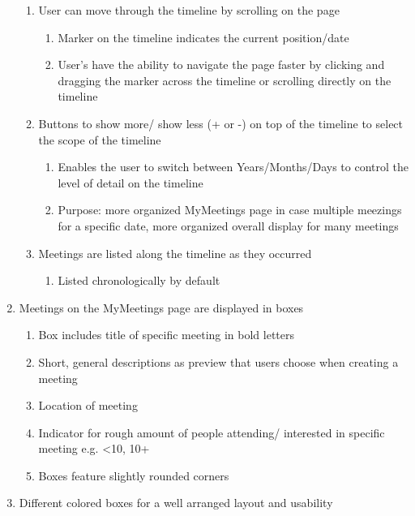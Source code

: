 \documentclass[conference]{IEEEtran}
\begin{document}
\begin{enumerate}
    \begin{enumerate}
        \item User can move through the timeline by scrolling on the page
        \begin{enumerate}
            \item Marker on the timeline indicates the current position/date
            \item User’s have the ability to navigate the page faster by clicking and dragging the marker across the timeline or scrolling directly on the timeline
        \end{enumerate}
        \item Buttons to show more/ show less (+ or -) on top of the timeline to select the scope of the timeline
        \begin{enumerate}
            \item Enables the user to switch between Years/Months/Days to control the level of detail on the timeline
            \item Purpose: more organized MyMeetings page in case multiple meezings for a specific date, more organized overall display for many meetings
        \end{enumerate}
        \item Meetings are listed along the timeline as they occurred
        \begin{enumerate}
            \item Listed chronologically by default
        \end{enumerate}
    \end{enumerate}
    \item  Meetings on the MyMeetings page are displayed in boxes
    \begin{enumerate}
        \item Box includes title of specific meeting in bold letters
        \item Short, general descriptions as preview that users choose when creating a meeting
        \item Location of meeting
        \item Indicator for rough amount of people attending/ interested in specific meeting e.g. <10, 10+
        \item Boxes feature slightly rounded corners
    \end{enumerate}
    \item Different colored boxes for a well arranged layout and usability
    \begin{enumerate}

\end{enumerate}
\end{enumerate}
\end{document}
